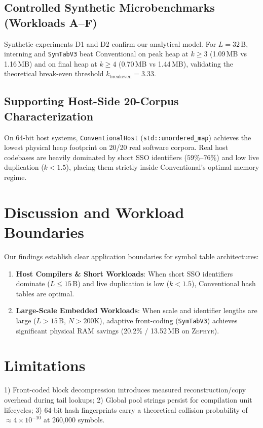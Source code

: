 \documentclass[conference]{IEEEtran}
\begin{document}
\subsection{Controlled Synthetic Microbenchmarks (Workloads A--F)}
Synthetic experiments D1 and D2 confirm our analytical model. For $L=32$\,B, interning and \texttt{SymTabV3} beat Conventional on peak heap at $k \ge 3$ (1.09\,MB vs 1.16\,MB) and on final heap at $k \ge 4$ (0.70\,MB vs 1.44\,MB), validating the theoretical break-even threshold $k_{\text{breakeven}} = 3.33$.

\subsection{Supporting Host-Side 20-Corpus Characterization}
On 64-bit host systems, \texttt{ConventionalHost} (\texttt{std::unordered\_map}) achieves the lowest physical heap footprint on 20/20 real software corpora. Real host codebases are heavily dominated by short SSO identifiers ($59\%$--$76\%$) and low live duplication ($k < 1.5$), placing them strictly inside Conventional's optimal memory regime.

\section{Discussion and Workload Boundaries}
Our findings establish clear application boundaries for symbol table architectures:
\begin{enumerate}
    \item \textbf{Host Compilers \& Short Workloads}: When short SSO identifiers dominate ($L \le 15$\,B) and live duplication is low ($k < 1.5$), Conventional hash tables are optimal.
    \item \textbf{Large-Scale Embedded Workloads}: When scale and identifier lengths are large ($L > 15$\,B, $N > 200\text{K}$), adaptive front-coding (\texttt{SymTabV3}) achieves significant physical RAM savings (20.2\% / 13.52\,MB on \textsc{Zephyr}).
\end{enumerate}

\section{Limitations}
1) Front-coded block decompression introduces measured reconstruction/copy overhead during tail lookups;
2) Global pool strings persist for compilation unit lifecycles;
3) 64-bit hash fingerprints carry a theoretical collision probability of $\approx 4 \times 10^{-10}$ at 260,000 symbols.
\end{document}
